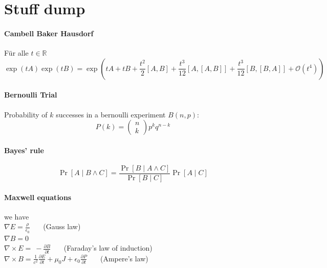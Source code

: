 




\usepackage[arrow, matrix, curve]{xy}
\usepackage{wrapfig}
\usepackage{bm}
\usepackage{multicol}
\usepackage{xcolor}
\usepackage{mathrsfs} 
\renewcommand\vec{\boldsymbol}




\section{Stuff dump}

\paragraph{Cambell Baker Hausdorf} Für alle $t \in \mathbb{R}$ 
$$ 
\exp(t A) \exp(t B)= \exp \left(t A+t B+\frac{t^2}{2}[A, B]
+\frac{t^3}{12} [A,[A, B]] +\frac{t^3}{12}[B,[B, A]]+\mathscr{O}\left(t^4\right)\right)
$$
 


\paragraph{Bernoulli Trial} Probability of $k$ successes in a bernoulli experiment $B(n,p)$:
$$P(k)=\left(\begin{array}{l}
  n \\
  k
  \end{array}\right) p^k q^{n-k} $$

\paragraph{Bayes' rule}  $$
\operatorname{Pr}[A \mid B \wedge C]=\frac{\operatorname{Pr}[B \mid A \wedge C]}{\operatorname{Pr}[B \mid C]} \operatorname{Pr}[A \mid C]
$$

\paragraph{Maxwell equations} we have \\
$ \nabla E = \frac{\rho}{\epsilon_0}  \quad  $  \ (Gauss law)   \\
$ \nabla B = 0 $ \\
$ \nabla \times E = \ - \frac{\partial B}{\partial t} \quad  $ \  (Faraday's law of induction) \\
$ \nabla \times B = \frac{1}{c^2} \frac{ \partial E}{\partial t} + \mu_0 J + \epsilon_0 \frac{\partial P} {\partial t} \quad $ \ (Ampere's law)


